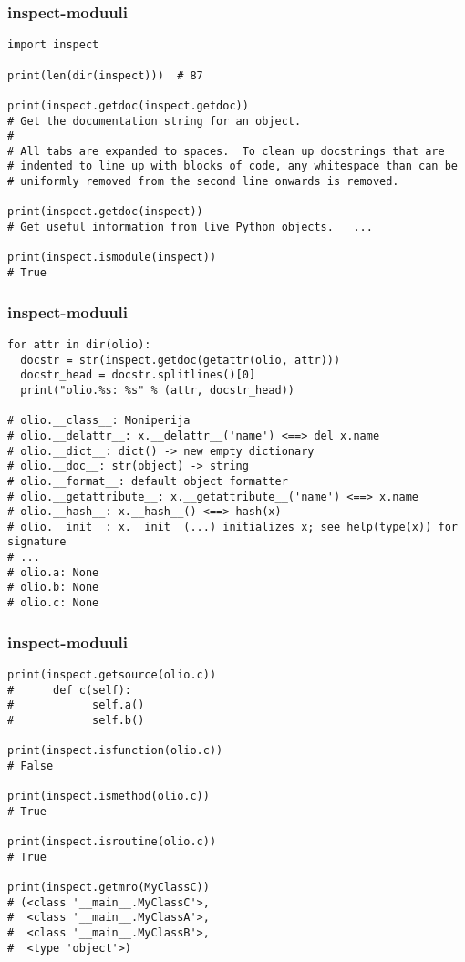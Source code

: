 \documentclass{beamer}
\begin{document}
\begin{frame}[fragile]
\frametitle{inspect-moduuli}
\begin{verbatim}
import inspect

print(len(dir(inspect)))  # 87

print(inspect.getdoc(inspect.getdoc))
# Get the documentation string for an object.
# 
# All tabs are expanded to spaces.  To clean up docstrings that are
# indented to line up with blocks of code, any whitespace than can be
# uniformly removed from the second line onwards is removed.

print(inspect.getdoc(inspect))
# Get useful information from live Python objects.   ...

print(inspect.ismodule(inspect))
# True

\end{verbatim}
\end{frame}

\begin{frame}[fragile]
\frametitle{inspect-moduuli}
\begin{verbatim}
for attr in dir(olio):
  docstr = str(inspect.getdoc(getattr(olio, attr)))
  docstr_head = docstr.splitlines()[0]
  print("olio.%s: %s" % (attr, docstr_head))

# olio.__class__: Moniperija
# olio.__delattr__: x.__delattr__('name') <==> del x.name
# olio.__dict__: dict() -> new empty dictionary
# olio.__doc__: str(object) -> string
# olio.__format__: default object formatter
# olio.__getattribute__: x.__getattribute__('name') <==> x.name
# olio.__hash__: x.__hash__() <==> hash(x)
# olio.__init__: x.__init__(...) initializes x; see help(type(x)) for signature
# ...
# olio.a: None
# olio.b: None
# olio.c: None

\end{verbatim}
\end{frame}

\begin{frame}[fragile]
\frametitle{inspect-moduuli}
\begin{verbatim}
print(inspect.getsource(olio.c))
#      def c(self):
#            self.a()
#            self.b()

print(inspect.isfunction(olio.c))
# False

print(inspect.ismethod(olio.c))
# True

print(inspect.isroutine(olio.c))
# True

print(inspect.getmro(MyClassC))
# (<class '__main__.MyClassC'>, 
#  <class '__main__.MyClassA'>, 
#  <class '__main__.MyClassB'>, 
#  <type 'object'>)

\end{verbatim}
\end{frame}
\end{document}
